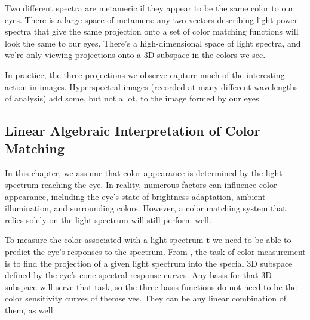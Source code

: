 Two different spectra are metameric if they appear to be the same color to our eyes.
There is a large space of metamers:  any two 
vectors describing light power spectra
that give the same projection onto a set of color matching functions
will look the same to our eyes.  There's a high-dimensional space of light spectra, and we're
only viewing projections onto a 3D subspace in the colors we see.

In practice, the three projections we observe capture much of the interesting action in images.  Hyperspectral images (recorded at many different wavelengths of analysis) add some, but not
a lot, to the image formed by our eyes.



\subsection{Linear Algebraic Interpretation of Color Matching}



In this chapter, we assume that color appearance is determined by the light spectrum reaching the eye. In reality, numerous factors can influence color appearance, including the eye's state of brightness adaptation, ambient illumination, and surrounding colors. However, a color matching system that relies solely on the light spectrum will still perform well.

To measure the color associated with a light spectrum $\mathbf{t}$ we need to be able to predict the eye's responses to the spectrum.
From \eqn{\ref{eq:lmsct}}, the task of color measurement is to find the projection of a given light spectrum into the
special 3D subspace defined by the eye's cone spectral response curves.
Any basis for that 3D subspace will serve that task, so the three basis
functions do not need to be the color sensitivity curves of
\fig{\ref{fig:ramon}} themselves.  They can be any linear combination
of them, as well. 

